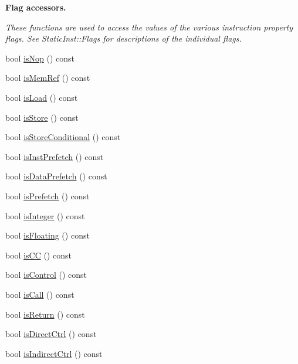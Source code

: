 \begin{Indent}{\bf Flag accessors.}\par
{\em \label{_amgrpce983375433c37c7bd0600df2f4d8060}
 These functions are used to access the values of the various instruction property flags. See StaticInst::Flags for descriptions of the individual flags. }\begin{DoxyCompactItemize}
\item 
bool \hyperlink{classStaticInst_a45dbb9ace4c729e7bb701ce535fb1667}{isNop} () const 
\item 
bool \hyperlink{classStaticInst_a9b0f2cd082a656c4b5f369b5362c2f5b}{isMemRef} () const 
\item 
bool \hyperlink{classStaticInst_afef57d32aae2e0d962889f6e0537bf31}{isLoad} () const 
\item 
bool \hyperlink{classStaticInst_a75d02c30242181ed8a68f61087c2242d}{isStore} () const 
\item 
bool \hyperlink{classStaticInst_a7023ade89206ed967e6af7397cb744f8}{isStoreConditional} () const 
\item 
bool \hyperlink{classStaticInst_ab7deedfb63be4690f506acd0444dde3a}{isInstPrefetch} () const 
\item 
bool \hyperlink{classStaticInst_abe301c4b09b8eb65bc2203905b1abf53}{isDataPrefetch} () const 
\item 
bool \hyperlink{classStaticInst_a1eef1bb814a1f77346aba1648fb6d1c9}{isPrefetch} () const 
\item 
bool \hyperlink{classStaticInst_a06625615adfaf28305767ac42b1ef0a4}{isInteger} () const 
\item 
bool \hyperlink{classStaticInst_a58024ee3f69c53c47ec5b315b78a7302}{isFloating} () const 
\item 
bool \hyperlink{classStaticInst_aeede7bb34cb5eee4979cd2f6e9f361dc}{isCC} () const 
\item 
bool \hyperlink{classStaticInst_a2ff117edfab9c8486802c441ac331086}{isControl} () const 
\item 
bool \hyperlink{classStaticInst_aa2317a020504e552097abb001847f74c}{isCall} () const 
\item 
bool \hyperlink{classStaticInst_a56f87bc75115f1dcea77803b01f40d2c}{isReturn} () const 
\item 
bool \hyperlink{classStaticInst_ac218ba4230a8cd92999948288a54e14f}{isDirectCtrl} () const 
\item 
bool \hyperlink{classStaticInst_a5dfa427a48589c4c910416a67808510f}{isIndirectCtrl} () const 
\item 

\end{DoxyCompactItemize}
\end{Indent}

